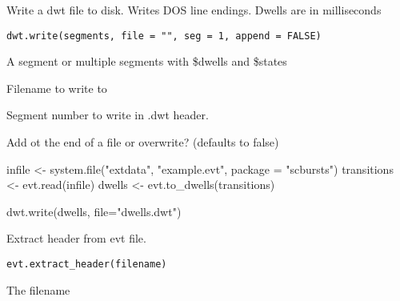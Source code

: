 \documentclass[letterpaper]{book}
\begin{document}
%
\begin{Description}\relax
Write a dwt file to disk. Writes DOS line endings. Dwells are in milliseconds
\end{Description}
%
\begin{Usage}
\begin{verbatim}
dwt.write(segments, file = "", seg = 1, append = FALSE)
\end{verbatim}
\end{Usage}
%
\begin{Arguments}
\begin{ldescription}
\item[\code{segments}] A segment or multiple segments with \$dwells and \$states

\item[\code{file}] Filename to write to

\item[\code{seg}] Segment number to write in .dwt header.

\item[\code{append}] Add ot the end of a file or overwrite? (defaults to false)
\end{ldescription}
\end{Arguments}
%
\begin{Examples}
\begin{ExampleCode}

infile <- system.file("extdata", "example.evt", package = "scbursts")
transitions <- evt.read(infile)
dwells <- evt.to_dwells(transitions)

dwt.write(dwells, file="dwells.dwt")

\end{ExampleCode}
\end{Examples}
%
\begin{Description}\relax
Extract header from evt file.
\end{Description}
%
\begin{Usage}
\begin{verbatim}
evt.extract_header(filename)
\end{verbatim}
\end{Usage}
%
\begin{Arguments}
\begin{ldescription}
\item[\code{filename}] The filename
\end{ldescription}
\end{Arguments}
\end{document}
